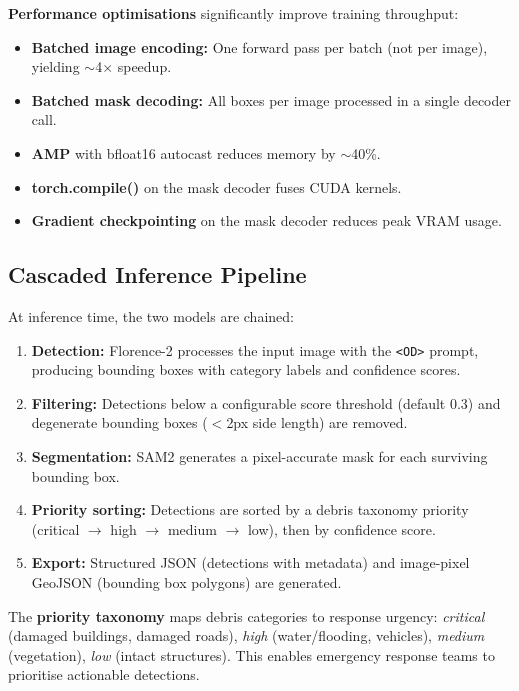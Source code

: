 \documentclass[10pt,a4paper,twocolumn]{article}
\begin{document}
\textbf{Performance optimisations} significantly improve training throughput:
\begin{itemize}
  \item \textbf{Batched image encoding:} One forward pass per batch (not per image), yielding $\sim$4$\times$ speedup.
  \item \textbf{Batched mask decoding:} All boxes per image processed in a single decoder call.
  \item \textbf{AMP} with bfloat16 autocast reduces memory by $\sim$40\%.
  \item \textbf{torch.compile()} on the mask decoder fuses CUDA kernels.
  \item \textbf{Gradient checkpointing} on the mask decoder reduces peak VRAM usage.
\end{itemize}

\subsection{Cascaded Inference Pipeline}

At inference time, the two models are chained:

\begin{enumerate}
  \item \textbf{Detection:} Florence-2 processes the input image with the \texttt{<OD>} prompt, producing bounding boxes with category labels and confidence scores.
  \item \textbf{Filtering:} Detections below a configurable score threshold (default 0.3) and degenerate bounding boxes ($<$2px side length) are removed.
  \item \textbf{Segmentation:} SAM2 generates a pixel-accurate mask for each surviving bounding box.
  \item \textbf{Priority sorting:} Detections are sorted by a debris taxonomy priority (critical $\rightarrow$ high $\rightarrow$ medium $\rightarrow$ low), then by confidence score.
  \item \textbf{Export:} Structured JSON (detections with metadata) and image-pixel GeoJSON (bounding box polygons) are generated.
\end{enumerate}

The \textbf{priority taxonomy} maps debris categories to response urgency: \textit{critical} (damaged buildings, damaged roads), \textit{high} (water/flooding, vehicles), \textit{medium} (vegetation), \textit{low} (intact structures). This enables emergency response teams to prioritise actionable detections.
\end{document}
